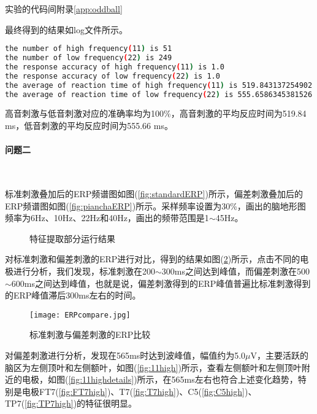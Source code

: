 \documentclass{hitreport}
\begin{document}
实验的代码间附录\ref{app:oddball}

最终得到的结果如log文件所示。
\begin{lstlisting}[language=bash]
the number of high frequency(11) is 51
the number of low frequency(22) is 249
the response accuracy of high frequency(11) is 1.0
the response accuracy of low frequency(22) is 1.0
the average of reaction time of high frequency(11) is 519.843137254902
the average of reaction time of low frequency(22) is 555.6586345381526
\end{lstlisting}


高音刺激与低音刺激对应的准确率均为100\%，高音刺激的平均反应时间为519.84 ms，低音刺激的平均反应时间为555.66 ms。

\paragraph{问题二}~{}

标准刺激叠加后的ERP频谱图如图(\ref{fig:standardERP})所示，偏差刺激叠加后的ERP频谱图如图(\ref{fig:pianchaERP})所示。采样频率设置为30\%，画出的脑地形图频率为6Hz、10Hz、22Hz和40Hz，画出的频带范围是1$\sim$45Hz。

\begin{figure}[htb]
	\centering
	\hspace{5pt}
	\caption{特征提取部分运行结果}\label{fig:feature}
\end{figure}

对标准刺激和偏差刺激的ERP进行对比，得到的结果如图(\ref{fig:ERPcompare})所示，点击不同的电极进行分析，我们发现，标准刺激在200$\sim$300ms之间达到峰值，而偏差刺激在500$\sim$600ms之间达到峰值，也就是说，偏差刺激得到的ERP峰值普遍比标准刺激得到的ERP峰值滞后300ms左右的时间。

\begin{figure}[htb]
\centering
\texttt{[image: ERPcompare.jpg]}
\caption{标准刺激与偏差刺激的ERP比较}\label{fig:ERPcompare}
\end{figure}

对偏差刺激进行分析，发现在565ms时达到波峰值，幅值约为5.0$\mu$V，主要活跃的脑区为左侧顶叶和左侧额叶，如图(\ref{fig:11high})所示，查看左侧额叶和左侧顶叶附近的电极，如图(\ref{fig:11highdetails})所示，在565ms左右也符合上述变化趋势，特别是电极FT7(\ref{fig:FT7high})、T7(\ref{fig:T7high})、C5(\ref{fig:C5high})、TP7(\ref{fig:TP7high})的特征很明显。
\end{document}

